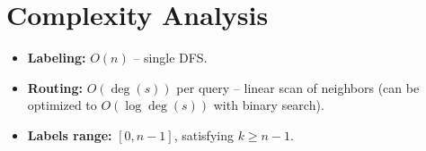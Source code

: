 \documentclass[11pt,a4paper]{article}
\begin{document}
\section{Complexity Analysis}
\begin{itemize}
  \item \textbf{Labeling:} $O(n)$ -- single DFS.
  \item \textbf{Routing:} $O(\deg(s))$ per query -- linear scan of neighbors (can be optimized to $O(\log \deg(s))$ with binary search).
  \item \textbf{Labels range:} $[0, n-1]$, satisfying $k \ge n - 1$.
\end{itemize}
\end{document}
